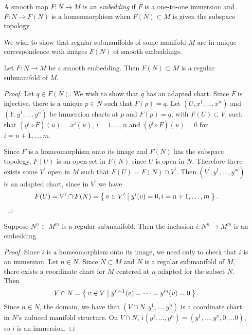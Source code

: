 \begin{defn}
A smooth map $F: N \to M$ is an \emph{embedding} if $F$ is a
one-to-one immersion and $F : N \to F(N)$ is a homeomorphism when
$F(N) \subset M$ is given the subspace topology.
\end{defn}

We wish to show that regular submanifolds of some manifold $M$ are in
unique correspondence with images $F(N)$ of smooth embeddings.

\begin{prop}
Let $F: N \to M$ be a smooth embedding. Then $F(N) \subset M$ is a
regular submanifold of $M$.
\end{prop}

\begin{proof}
Let $q \in F(N)$. We wish to show that $q$ has an adapted chart.
Since $F$ is injective, there is a unique $p \in N$ such that
$F(p) = q$. Let $(U, x^1, \dots, x^n)$ and $(Y, y^1, \dots, y^n)$ be
immersion charts at $p$ and $F(p) = q$, with $F(U) \subset V$, such that
$(y^i \circ F)(u) = x^i(u)$, $i = 1, \dots, n$
and $(y^i \circ F)(u) = 0$ for $i = n+1, \dots, m$.

Since $F$ is a homeomorphism onto its image and $F(N)$ has the
subspace topology, $F(U)$ is an open set in $F(N)$ since $U$ is open
in $N$. Therefore there exists some $V^\prime$ open in $M$ such that
$F(U) = F(N) \cap V^\prime$. Then $(V^\prime, y^1, \dots, y^m)$ is an
adapted chart, since in $V^\prime$ we have
$$
  F(U)
= V^\prime \cap F(N)
= \Set{ v \in V^\prime | y^i(v) = 0, i = n+1, \dots, m }.
$$
\end{proof}

\begin{prop}
Suppose $N^n \subset M^m$ is a regular submanifold. Then the inclusion
$i : N^n \to M^m$ is an embedding.
\end{prop}

\begin{proof}
Since $i$ is a homeomorphism onto its image, we need only to check
that $i$ is an immersion. Let $n \in N$. Since $N \subset M$ and $N$ is a regular
submanifold of $M$, there exists a coordinate chart for $M$ centered
at $n$ adapted for the subset $N$. Then
$$
  V \cap N
= \Set{ v \in V | y^{n+1}(v) = \cdots = y^m(v) = 0 }.
$$
Since $n \in N$, the domain, we have that
$(V \cap N, y^1, \dots, y^n)$ is a coordinate chart in $N$'s induced
manifold structure. On $V \cap N$,
$i(y^1, \dots, y^n) = (y^1, \dots, y^n, 0, \dots 0)$, so $i$ is an immersion.
\end{proof}

